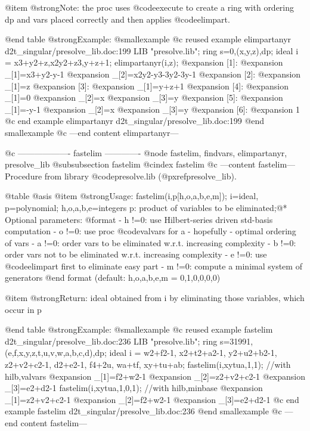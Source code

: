 @item @strong{Note:}
the proc uses @code{execute} to create a ring with ordering dp and vars
placed correctly and then applies @code{elimpart}.

@end table
@strong{Example:}
@smallexample
@c reused example elimpartanyr d2t_singular/presolve_lib.doc:199 
LIB "presolve.lib";
ring s=0,(x,y,z),dp;
ideal i = x3+y2+z,x2y2+z3,y+z+1;
elimpartanyr(i,z);
@expansion{} [1]:
@expansion{}    _[1]=x3+y2-y-1
@expansion{}    _[2]=x2y2-y3-3y2-3y-1
@expansion{} [2]:
@expansion{}    _[1]=z
@expansion{} [3]:
@expansion{}    _[1]=y+z+1
@expansion{} [4]:
@expansion{}    _[1]=0
@expansion{}    _[2]=x
@expansion{}    _[3]=y
@expansion{} [5]:
@expansion{}    _[1]=-y-1
@expansion{}    _[2]=x
@expansion{}    _[3]=y
@expansion{} [6]:
@expansion{}    1
@c end example elimpartanyr d2t_singular/presolve_lib.doc:199
@end smallexample
@c ---end content elimpartanyr---

@c ------------------- fastelim -------------
@node fastelim, findvars, elimpartanyr, presolve_lib
@subsubsection fastelim
@cindex fastelim
@c ---content fastelim---
Procedure from library @code{presolve.lib} (@pxref{presolve_lib}).

@table @asis
@item @strong{Usage:}
fastelim(i,p[h,o,a,b,e,m]); i=ideal, p=polynomial; h,o,a,b,e=integers
p: product of variables to be eliminated;@*
Optional parameters:
  @format
  - h !=0: use Hilbert-series driven std-basis computation
  - o !=0: use proc @code{valvars} for a - hopefully - optimal ordering of vars
  - a !=0: order vars to be eliminated w.r.t. increasing complexity
  - b !=0: order vars not to be eliminated w.r.t. increasing complexity
  - e !=0: use @code{elimpart} first to eliminate easy part
  - m !=0: compute a minimal system of generators
  @end format
(default: h,o,a,b,e,m = 0,1,0,0,0,0)

@item @strong{Return:}
ideal obtained from i by eliminating those variables, which occur in p

@end table
@strong{Example:}
@smallexample
@c reused example fastelim d2t_singular/presolve_lib.doc:236 
LIB "presolve.lib";
ring s=31991,(e,f,x,y,z,t,u,v,w,a,b,c,d),dp;
ideal i = w2+f2-1, x2+t2+a2-1,  y2+u2+b2-1, z2+v2+c2-1,
d2+e2-1, f4+2u, wa+tf, xy+tu+ab;
fastelim(i,xytua,1,1);       //with hilb,valvars
@expansion{} _[1]=f2+w2-1
@expansion{} _[2]=z2+v2+c2-1
@expansion{} _[3]=e2+d2-1
fastelim(i,xytua,1,0,1);     //with hilb,minbase
@expansion{} _[1]=z2+v2+c2-1
@expansion{} _[2]=f2+w2-1
@expansion{} _[3]=e2+d2-1
@c end example fastelim d2t_singular/presolve_lib.doc:236
@end smallexample
@c ---end content fastelim---

